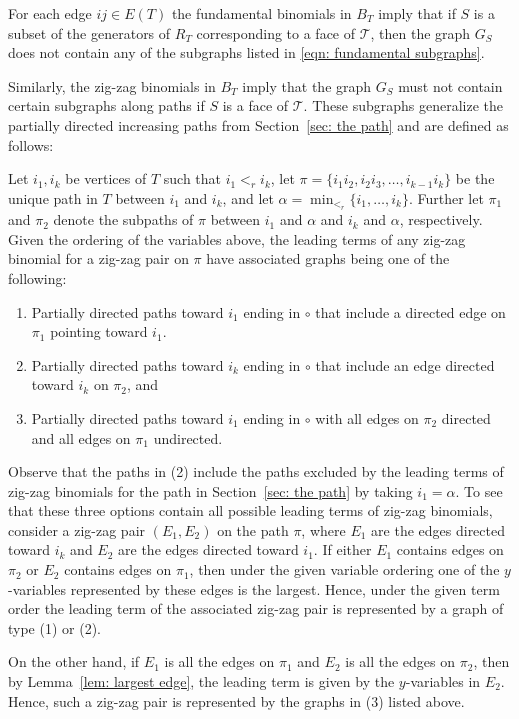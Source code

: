 For each edge $ij\in E(T)$ the fundamental binomials in $B_T$ imply that if $S$ is a subset of the generators of $R_T$ corresponding to a face of $\mathcal{T}$, then the graph $G_S$ does not contain any of the subgraphs listed in \eqref{eqn: fundamental subgraphs}.


Similarly, the zig-zag binomials in $B_T$ imply that the graph $G_S$ must not contain certain subgraphs along paths if $S$ is a face of $\mathcal{T}$. These subgraphs generalize the partially directed increasing paths from Section~\ref{sec: the path} and are defined as follows:

Let $i_1,i_k$ be vertices of $T$ such that $i_1 <_r i_k$, let $\pi = \{i_1i_2, i_2i_3, \ldots, i_{k-1}i_k\}$ be the unique path in $T$ between $i_1$ and $i_k$, and let $\alpha = \min_{<_r}\{i_1,\ldots, i_k\}$. 
Further let $\pi_1$ and $\pi_2$ denote the subpaths of $\pi$ between $i_1$ and $\alpha$ and $i_k$ and $\alpha$, respectively. 
Given the ordering of the variables above, the leading terms of any zig-zag binomial for a zig-zag pair on $\pi$ have associated graphs being one of the following:
\begin{enumerate}
    \item Partially directed paths toward $i_1$ ending in $\circ$ that include a directed edge on $\pi_1$ pointing toward $i_1$. 
    \item Partially directed paths toward $i_k$ ending in $\circ$ that include an edge directed toward $i_k$ on $\pi_2$, and
    \item Partially directed paths toward $i_1$ ending in $\circ$ with all edges on $\pi_2$ directed and all edges on $\pi_1$ undirected. 
\end{enumerate}

Observe that the paths in (2) include the paths excluded by the leading terms of zig-zag binomials for the path in Section~\ref{sec: the path} by taking $i_1 = \alpha$. 
To see that these three options contain all possible leading terms of zig-zag binomials, consider a zig-zag pair $(E_1,E_2)$ on the path $\pi$, where $E_1$ are the edges directed toward $i_k$ and $E_2$ are the edges directed toward $i_1$. 
If either $E_1$ contains edges on $\pi_2$ or $E_2$ contains edges on $\pi_1$, then under the given variable ordering one of the $y$-variables represented by these edges is the largest.  
Hence, under the given term order the leading term of the associated zig-zag pair is represented by a graph of type (1) or (2).  

On the other hand, if $E_1$ is all the edges on $\pi_1$ and $E_2$ is all the edges on $\pi_2$, then by Lemma~\ref{lem: largest edge}, the leading term is given by the $y$-variables in $E_2$.  
Hence, such a zig-zag pair is represented by the graphs in (3) listed above. 

